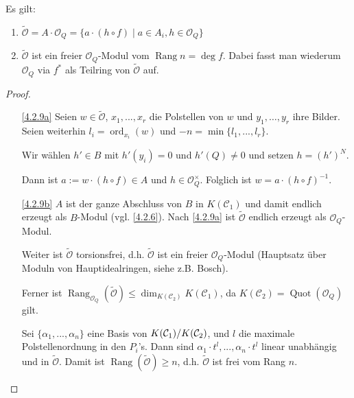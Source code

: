 \documentclass[a4paper,12pt,index=toc]{scrbook}
\theoremstyle{keinenummern} %
\def\CC{\mathcal{C}}
\def\O{\mathcal{O}}
\newcommand{\Rang}{\operatorname{Rang}}
\newcommand{\ord}{\operatorname{ord}}
\newcommand{\Quot}{\operatorname{Quot}}
\renewcommand{\dotsc}{\ensuremath{\!...}}
\newcommand{\schlange}[1]{\widetilde{#1}}
\begin{document}
\begin{lem}\label{4.2.9} Es gilt:
  \begin{enumerate}
  \item\label{4.2.9a} $\schlange{\O}=A\cdot \O_Q=\{a\cdot (h\circ f) \mid a\in A_i, h\in \O_Q\}$
  \item\label{4.2.9b} $\schlange{\O}$ ist ein freier $\O_Q$-Modul vom $\Rang n=\deg f$. Dabei fasst man wiederum $\O_Q$ via $f^*$ als Teilring von $\schlange{\O}$ auf.
  \end{enumerate}
\end{lem}

\begin{proof}
\begin{enumerate}
\item[\ref{4.2.9a}] Seien $w\in \schlange{\O}$, $x_1,\dotsc,x_r$ die Polstellen von $w$ und $y_1,\dots,y_r$ ihre Bilder. Seien weiterhin $l_i=\ord_{x_i} (w)$ und $-n=\min\{l_1,\dotsc,l_r\}$.

Wir wählen $h'\in B$ mit $h'(y_i)=0$ und $h'(Q)\neq 0$ und setzen $h=(h')^N$. 

Dann ist $a:=w\cdot (h\circ f)\in A$ und $h\in \O_Q^{\times}$. Folglich ist $w=a\cdot (h\circ f)^{-1}$.
\item[\ref{4.2.9b}] $A$ ist der ganze Abschluss von $B$ in $K(\CC_1)$ und damit endlich erzeugt als $B$-Modul (vgl. \cref{4.2.6}). Nach \ref{4.2.9a} ist $\schlange{\O}$ endlich erzeugt als $\O_Q$-Modul.

Weiter ist $\schlange{\O}$ torsionsfrei, d.h. $\schlange{\O}$ ist ein freier $\O_Q$-Modul (Hauptsatz über Moduln von Hauptidealringen, siehe z.B. Bosch).

Ferner ist $\Rang_{\O_Q} (\schlange{\O}) \le \dim_{K(\CC_2)} K(\CC_1)$, da $K(\CC_2)=\Quot (\O_Q)$ gilt.

Sei $\{\alpha_1,\dotsc,\alpha_n\}$ eine Basis von $\Quotient{K(\CC_1)}{K(\CC_2)}$, und $l$ die maximale Polstellenordnung in den $P_i$'s. Dann sind $\alpha_1\cdot t^l,\dotsc,\alpha_n\cdot t^l$ linear unabhängig und in $\schlange{\O}$. 
Damit ist $\Rang (\schlange{\O})\ge n$, d.h. $\schlange{\O}$ ist frei vom Rang $n$. 
\end{enumerate}
\end{proof}
\end{document}
